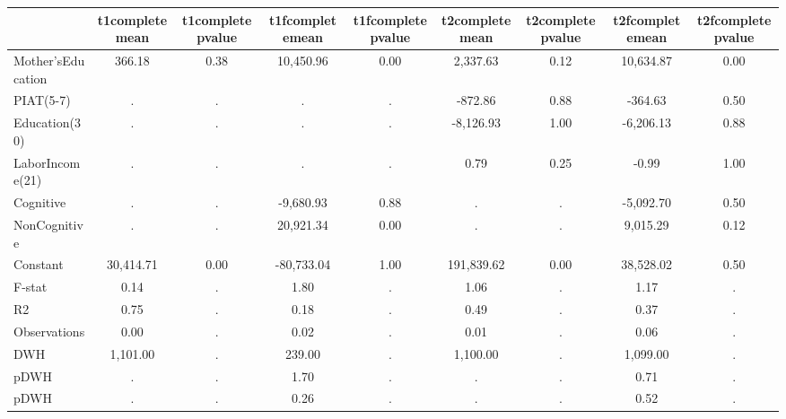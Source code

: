 \begin{table}[htbp]
\begin{tabular}{lcccccccc} \hline \hline
 & t1completemean  & t1completepvalue  & t1fcompletemean  & t1fcompletepvalue  & t2completemean  & t2completepvalue  & t2fcompletemean  & t2fcompletepvalue  \\  \hline 
Mother'sEducation &       366.18 &         0.38 &    10,450.96 &         0.00 &     2,337.63 &         0.12 &    10,634.87 &         0.00 \\  
PIAT(5-7) &            . &            . &            . &            . &      -872.86 &         0.88 &      -364.63 &         0.50 \\  
Education(30) &            . &            . &            . &            . &    -8,126.93 &         1.00 &    -6,206.13 &         0.88 \\  
LaborIncome(21) &            . &            . &            . &            . &         0.79 &         0.25 &        -0.99 &         1.00 \\  
Cognitive &            . &            . &    -9,680.93 &         0.88 &            . &            . &    -5,092.70 &         0.50 \\  
NonCognitive &            . &            . &    20,921.34 &         0.00 &            . &            . &     9,015.29 &         0.12 \\  
Constant &    30,414.71 &         0.00 &   -80,733.04 &         1.00 &   191,839.62 &         0.00 &    38,528.02 &         0.50 \\  
F-stat &         0.14 &            . &         1.80 &            . &         1.06 &            . &         1.17 &            . \\  
R2 &         0.75 &            . &         0.18 &            . &         0.49 &            . &         0.37 &            . \\  
Observations &         0.00 &            . &         0.02 &            . &         0.01 &            . &         0.06 &            . \\  
DWH &     1,101.00 &            . &       239.00 &            . &     1,100.00 &            . &     1,099.00 &            . \\  
pDWH &            . &            . &         1.70 &            . &            . &            . &         0.71 &            . \\  
pDWH &            . &            . &         0.26 &            . &            . &            . &         0.52 &            . \\  
\hline \hline \end{tabular}
\end{table}
